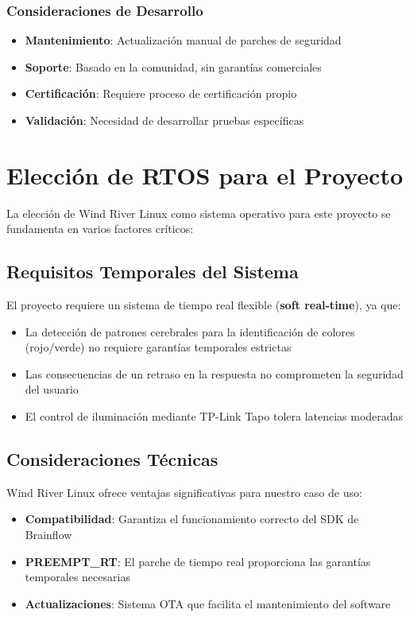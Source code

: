         \subsubsection{Consideraciones de Desarrollo}
            \begin{itemize}
                \item \textbf{Mantenimiento}: Actualización manual de parches de seguridad
                \item \textbf{Soporte}: Basado en la comunidad, sin garantías comerciales
                \item \textbf{Certificación}: Requiere proceso de certificación propio
                \item \textbf{Validación}: Necesidad de desarrollar pruebas específicas
            \end{itemize}

\newpage
\section{Elección de RTOS para el Proyecto}
    La elección de Wind River Linux como sistema operativo para este proyecto se fundamenta en varios factores críticos:

    \subsection{Requisitos Temporales del Sistema}
        El proyecto requiere un sistema de tiempo real flexible (\textbf{soft real-time}), ya que:
        \begin{itemize}
            \item La detección de patrones cerebrales para la identificación de colores (rojo/verde) no requiere garantías temporales estrictas
            \item Las consecuencias de un retraso en la respuesta no comprometen la seguridad del usuario
            \item El control de iluminación mediante TP-Link Tapo tolera latencias moderadas
        \end{itemize}

    \subsection{Consideraciones Técnicas}
        Wind River Linux ofrece ventajas significativas para nuestro caso de uso:
        \begin{itemize}
            \item \textbf{Compatibilidad}: Garantiza el funcionamiento correcto del SDK de Brainflow
            \item \textbf{PREEMPT\_RT}: El parche de tiempo real proporciona las garantías temporales necesarias
            \item \textbf{Actualizaciones}: Sistema OTA que facilita el mantenimiento del software
        \end{itemize}

